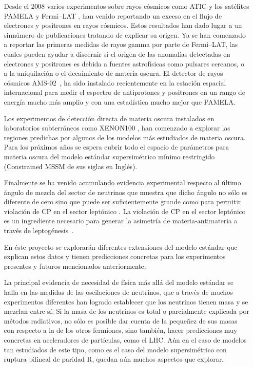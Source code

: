 Desde el 2008 varios experimentos sobre rayos cósmicos como ATIC
\cite{:2008zzr} y los satélites PAMELA \cite{Adriani:2008zr} y
Fermi--LAT \cite{Abdo:2009zk}, han venido reportando un exceso en el
flujo de electrones y positrones en rayos cósmicos. Estos resultados
han dado lugar a un sinnúmero de publicaciones tratando de explicar su
origen. Ya se han comenzado a reportar las primeras medidas de rayos
gamma por parte de Fermi--LAT, las cuales pueden ayudar a discernir si
el origen de las anomalías detectadas en electrones y positrones es
debida a fuentes astrofísicas como pulsares cercanos, o a la
aniquilación o el decaimiento de materia oscura. El detector de rayos
cósmicos AMS-02~\cite{ams:2009}, ha sido instalado recientemente en la
estación espacial internacional para medir el espectro de antiprotones
y positrones en un rango de energía mucho más amplio y con una
estadística mucho mejor que PAMELA.

Los experimentos de detección directa de materia oscura instalados en
laboratorios subterráneos como XENON100 \cite{Aprile:2011ts}, han
comenzado a explorar las regiones predichas por algunos de los modelos
más estudiados de materia oscura. Para los próximos años se espera
cubrir todo el espacio de parámetros para materia oscura del modelo
estándar supersimétrico mínimo restringido (Constrained MSSM de sus
siglas en Inglés).  

Finalmente se ha venido acumulando evidencia experimental respecto al último ángulo de mezcla del sector de neutrinos que muestra que dicho ángulo no sólo es diferente de cero sino que puede ser suficientemente grande como para permitir violación de CP en el sector leptónico \cite{valle}. La violación de CP en el sector leptónico es un ingrediente necesario para generar la asimetría de materia-antimateria a través de leptogénesis~\cite{Davidson:2008bu}.


En éste proyecto se explorarán diferentes extensiones del modelo
estándar que explican estos datos y tienen predicciones
concretas para los experimentos presentes y futuros mencionados
anteriormente.

La principal evidencia de necesidad de física más allá del modelo
estándar se halla en las medidas de las oscilaciones de neutrinos, que
a través de muchos experimentos diferentes han logrado establecer que
los neutrinos tienen masa y se mezclan entre sí. Si la masa de los
neutrinos es total o parcialmente explicada por métodos radiativos, no
sólo es posible dar cuenta de la pequeñez de sus masas con respecto a
la de los otros fermiones, sino también, hacer predicciones muy
concretas en aceleradores de partículas, como el LHC. Aún en el caso
de modelos tan estudiados de este tipo, como es el caso del modelo
supersimétrico con ruptura bilineal de paridad R, quedan aún muchos
aspectos que explorar.


